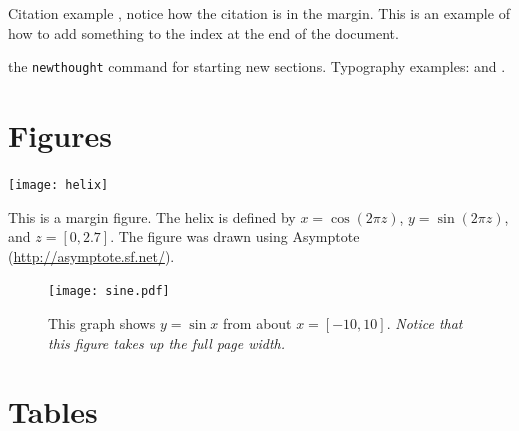 \documentclass{tufte-book} %
\begin{document}
Citation example \cite{Tufte2001}, notice how the citation is in the margin. This is an example of how to add something to the index at the end of the document.

 the \texttt{newthought} command for starting new sections. Typography examples:  and .


\section{Figures}

\lipsum[1] 

\begin{marginfigure}
\texttt{[image: helix]}
\caption{This is a margin figure. The helix is defined by $x = \cos(2\pi z)$, $y = \sin(2\pi z)$, and $z = [0, 2.7]$. The figure was drawn using Asymptote (\url{http://asymptote.sf.net/}).}
\label{fig:marginfig}
\end{marginfigure}

\lipsum[2]

\begin{figure}[h]
\texttt{[image: sine.pdf]}
\caption{This graph shows $y = \sin x$ from about $x = [-10, 10]$.
\emph{Notice that this figure takes up the full page width.}}
\label{fig:fullfig}
\end{figure}

\lipsum[3]


\section{Tables} 

\lipsum[4]
\end{document}
